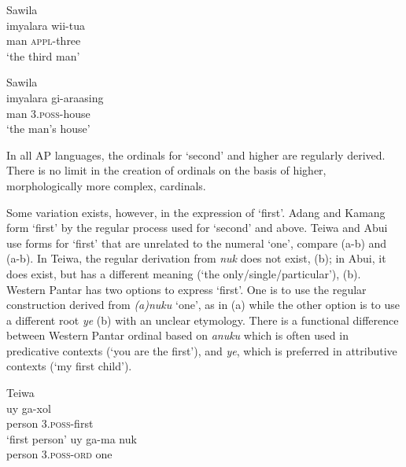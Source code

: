   

  


\ea%
\label{bkm:Ref355277550}
{\upshape Sawila}\\
\gll   imyalara   wii-tua\\  
   man    \textsc{appl-}three \\
\glt  `the third man'
\z

  

  




\ea%
\label{bkm:Ref342737790}
{\upshape Sawila}\\
\gll imyalara   gi-araasing \\  
    man    3.\textsc{poss}-house   \\
\glt`the man's house'
\z
 

In all AP languages, the ordinals for `second' and higher are regularly derived. There is no limit in the creation of ordinals on the basis of higher, morphologically more complex, cardinals.

Some variation exists, however, in the expression of `first'. Adang and Kamang form `first' by the regular process used for `second' and above. Teiwa and Abui use forms for `first' that are unrelated to the numeral `one', compare  (a-b) and  (a-b). In Teiwa, the regular derivation from \textit{nuk} does not exist, (b); in Abui, it does exist, but has a different meaning (`the only/single/particular'), (b). Western Pantar has two options to express `first'. One is to use the regular construction derived from \textit{(a)nuku} `one', as in (a) while the other option is to use a different root \textit{ye} (b) with an unclear etymology. There is a functional difference between Western Pantar ordinal based on \textit{anuku} which is often used in predicative contexts (`you are the first'), and \textit{ye}, which is preferred in attributive contexts (`my first child'). 


\ea%
\label{bkm:Ref342651040}
{\upshape Teiwa}\\
\ea
\gll  uy    ga-xol \\  
     person    3\textsc{.poss}-first\\
\glt`first person'
\ex
\gll *uy    ga-ma    nuk\\
person    3\textsc{.poss-ord} one\\ 
\z\z
 



